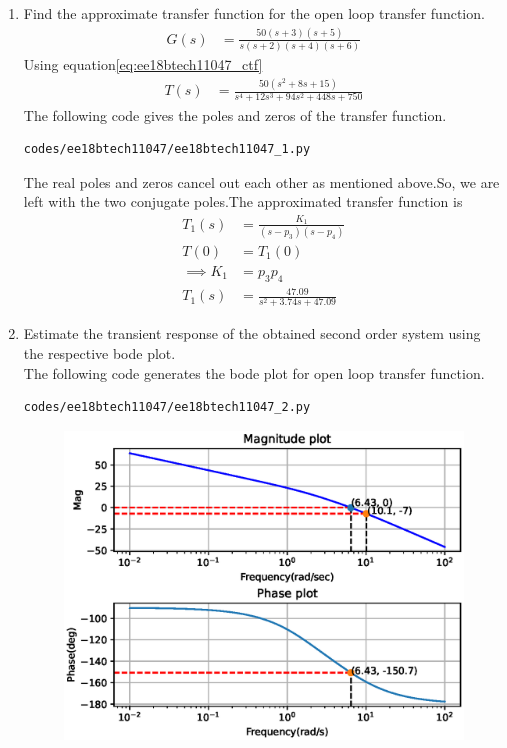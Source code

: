 \begin{enumerate}[label=\thesubsection.\arabic*.,ref=\thesubsection.\theenumi]
\item Find the approximate transfer function for the open loop transfer function.
\begin{align}
G(s) &= \frac{50(s+3)(s+5)}{s(s+2)(s+4)(s+6)}
\end{align}
\solution Using equation\eqref{eq:ee18btech11047_ctf}
\begin{align}
T(s) &= \frac{50(s^{2}+8s+15)}{s^4+12s^3+94s^2+448s+750}
\end{align}
The following code gives the poles and zeros of the transfer function.
\begin{lstlisting}
codes/ee18btech11047/ee18btech11047_1.py
\end{lstlisting}
\begin{table}[!ht]
\centering

\caption{}
\label{table:ee18btech11047}
\end{table}
The real poles  and zeros  cancel out each other as mentioned above.So, we are left with the two conjugate poles.The approximated transfer function is 
\begin{align}
T_{1}(s) &= \frac{K_{1}}{(s-p_{3})(s-p_{4})}\\ 
T(0) &= T_{1}(0)\\
\implies K_{1} &= p_{3}p_{4}\\
T_{1}(s) &= \frac{47.09}{s^{2}+3.74s+47.09}
\end{align}
\item Estimate the transient response of the obtained second order system using the respective bode plot.\\
\solution The following code generates the bode plot for open loop transfer function.
\begin{lstlisting}
codes/ee18btech11047/ee18btech11047_2.py
\end{lstlisting}
\begin{figure}[!ht]
\centering
\includegraphics[width=\columnwidth]{./figs/ee18btech11047/ee18btech11047_2.eps}

\end{figure}
\end{enumerate}
